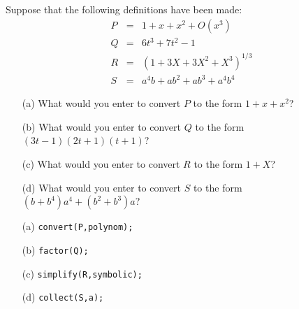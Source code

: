 \documentclass[a4paper]{article}
\begin{document}
\begin{problem}
 Suppose that the following definitions have been made:
 \begin{eqnarray*}
  P &=& 1+x+x^2+O(x^3) \\
  Q &=& 6t^3+7t^2-1 \\
  R &=& (1+3X+3X^2+X^3)^{1/3} \\
  S &=& a^4b + ab^2 + ab^3 + a^4b^4
 \end{eqnarray*}
 \begin{itemize}
  \item[(a)] What would you enter to convert $P$ to the form
   $1+x+x^2$? 
  \item[(b)] What would you enter to convert $Q$ to the form
   $(3t-1)(2t+1)(t+1)$?
  \item[(c)] What would you enter to convert $R$ to the form
   $1+X$?
  \item[(d)] What would you enter to convert $S$ to the form
   $(b+b^4)a^4+(b^2+b^3)a$?
 \end{itemize}
\end{problem}
\begin{solution}
 \begin{itemize}
  \item[(a)] \verb~convert(P,polynom);~  \mk
  \item[(b)] \verb~factor(Q);~ \mk
  \item[(c)] \verb~simplify(R,symbolic);~ \mk
  \item[(d)] \verb~collect(S,a);~ \mk
 \end{itemize}
\end{solution}
\end{document}
